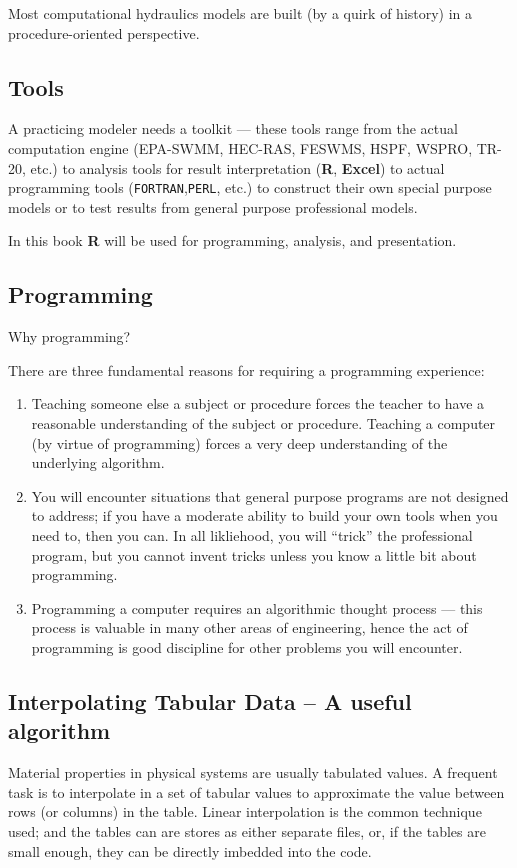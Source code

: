 Most computational hydraulics models are built (by a quirk of history) in a procedure-oriented perspective.

\subsection{Tools}
A practicing modeler needs a toolkit --- these tools range from the actual computation engine (EPA-SWMM, HEC-RAS, FESWMS, HSPF, WSPRO, TR-20, etc.) to analysis tools for result interpretation (\textbf{R}, \textbf{Excel}) to actual programming tools (\texttt{FORTRAN},\texttt{PERL}, etc.) to construct their own special purpose models or to test results from general purpose professional models.

In this book \textbf{R} will be used for programming, analysis, and presentation.  

\subsection{Programming}
Why programming?

There are three fundamental reasons for requiring a programming experience:
\begin{enumerate}
\item Teaching someone else a subject or procedure forces the teacher to have a reasonable understanding of the subject or procedure.  Teaching a computer (by virtue of programming) forces a very deep understanding of the underlying algorithm.  
\item You will encounter situations that general purpose programs are not designed to address; if you have a moderate ability to build your own tools when you need to, then you can.  In all likliehood, you will ``trick'' the professional program, but you cannot invent tricks unless you know a little bit about programming.
\item Programming a computer requires an algorithmic thought process --- this process is valuable in many other areas of engineering, hence the act of programming is good discipline for other problems you will encounter.
\end{enumerate}

\subsection{Interpolating Tabular Data -- A useful algorithm}
Material properties in physical systems are usually tabulated values.
A frequent task is to interpolate in a set of tabular values to approximate the value between rows (or columns) in the table.  
Linear interpolation is the common technique used; and the tables can are stores as either separate files, or, if the tables are small enough, they can be directly imbedded into the code.

